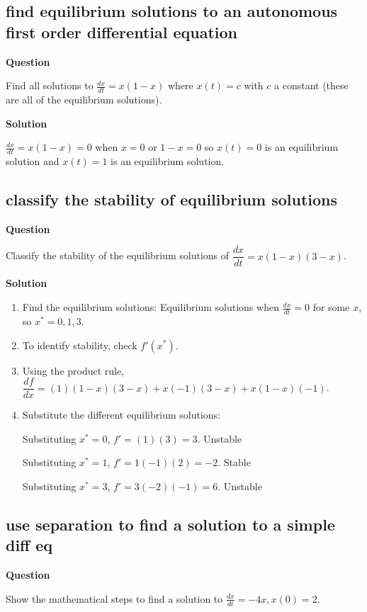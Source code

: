 \documentclass[12pt,letterpaper,noanswers]{exam}
\begin{document}
\subsection{find equilibrium solutions to an autonomous first order differential equation}
\noindent\textbf{Question}

Find all solutions to $\frac{dx}{dt} = x(1-x)$ where $x(t) = c$ with $c$ a constant (these are all of the equilibrium solutions).

\noindent\textbf{Solution}

$\frac{dx}{dt} = x(1-x) = 0$ when $ x = 0 $ or $1 - x = 0$ so $x(t) = 0$ is an equilibrium solution and $x(t) = 1$ is an equilibrium solution.


\subsection{classify the stability of equilibrium solutions}

\noindent\textbf{Question}

Classify the stability of the equilibrium solutions of $\dfrac{dx}{dt} = x(1-x)(3-x)$.

\noindent\textbf{Solution}

\begin{enumerate}
    \item Find the equilibrium solutions: Equilibrium solutions when $\frac{dx}{dt} = 0$ for some $x$, so $x^* = 0, 1, 3$.
    \item To identify stability, check $f'(x^*)$.
    \item Using the product rule,
$\dfrac{df}{dx} = (1)(1-x)(3-x) + x(-1)(3-x) + x(1-x)(-1)$.
\item Substitute the different equilibrium solutions: 

Substituting $x^* = 0$, $f' = (1)(3) = 3$.  Unstable

Substituting $x^* = 1$, $f' = 1(-1)(2) = -2$.  Stable

Substituting $x^* = 3$, $f' = 3(-2)(-1) = 6$.  Unstable
\end{enumerate}

\subsection{use separation to find a solution to a simple diff eq}
\noindent\textbf{Question}


Show the mathematical steps to find a solution to $\frac{dx}{dt} = -4x, x(0) = 2$.
\end{document}
